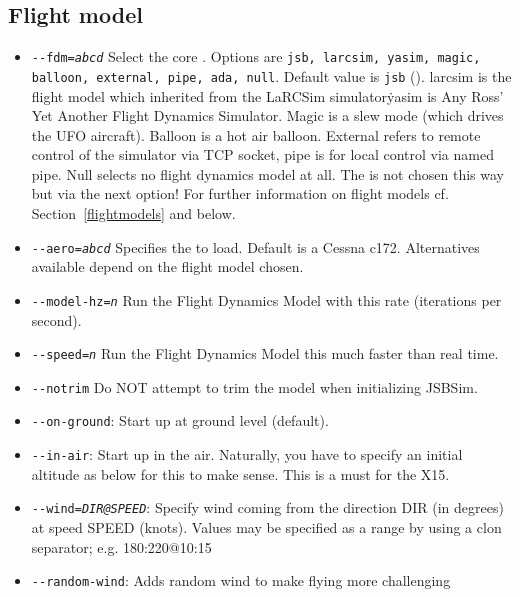 \subsection{Flight model}\label{flight dynamics model}
\begin{itemize}
\item{\texttt{-$ $-fdm={\it abcd}}} Select the core .
Options are \texttt{jsb, larcsim, yasim, magic, balloon, external, pipe, ada, null}. Default value is
\texttt{jsb} (\JSBSim). larcsim is the flight model which
\FlightGear{} inherited from the LaRCSim simulator\. yasim is Any Ross' Yet
Another Flight Dynamics Simulator. Magic is a slew mode (which drives the
UFO aircraft). Balloon is a hot air balloon. External refers to remote
control of the simulator via TCP socket, pipe is for local control via named
pipe. Null selects no flight dynamics model at all. The  is not chosen this way but via the next option! For further
information on flight models cf. Section~\ref{flightmodels} and below.
\item{\texttt{-$ $-aero={\it abcd}}} Specifies the  to load. Default is a Cessna c172. Alternatives available depend on the flight model chosen. 
\item{\texttt{-$ $-model-hz={\it n}}} Run the Flight Dynamics Model with this rate
(iterations per second).
\item{\texttt{-$ $-speed={\it n}}} Run the Flight Dynamics Model this much faster than real
time.
\item{\texttt{-$ $-notrim}} Do NOT attempt to trim the model when initializing JSBSim.
\item{\texttt{-$ $-on-ground}}: Start up at ground level (default).
\item{\texttt{-$ $-in-air}}: Start up in the air. Naturally, you have to specify an
initial altitude as below for this to make sense. This is a must for the X15.
\item{\texttt{-$ $-wind={\it DIR@SPEED}}}: Specify wind coming from the direction DIR (in
degrees) at speed SPEED (knots). Values may be specified as a range by using a clon separator; e.g. 180:220@10:15
\item{\texttt{-$ $-random-wind}}: Adds random wind to make flying more challenging
\end{itemize}

